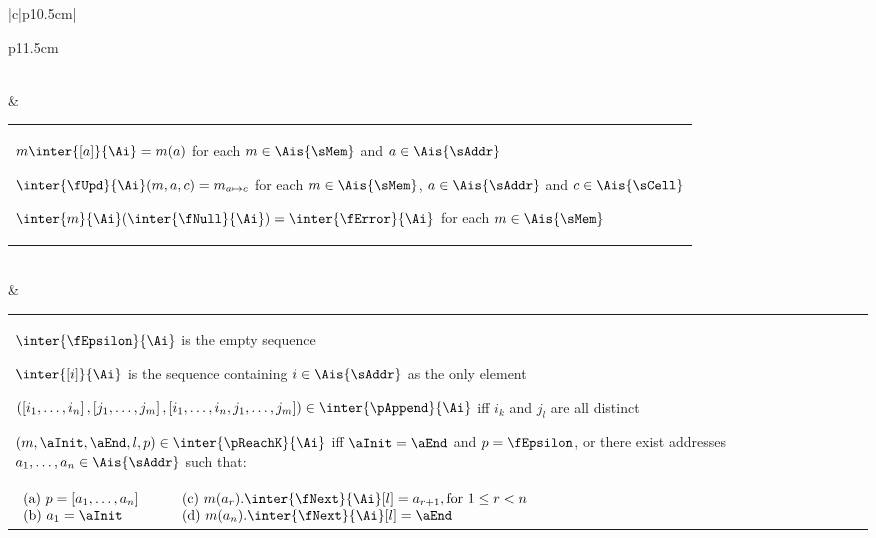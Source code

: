 {\begin{tabular}{|c|p{10.5cm}|}
\begin{tabular}{p{11.5cm}}
\begin{compactitem}
			\rangle$
			for each $e \in \Ais{\sElem}$,
			$k \in \Ais{\sOrd}$,
			$ \in \Ais{\sAddr}^{\K}$,
			$j \in \Ais{\sLevelK}$
			and $t_0, \ldots, t_{} \in \Ais{\sThId}$
		\item $\inter{\fError}{\Ai}.\inter{\fNext}{\Ai} =
			\inter{\fNull}{\Ai}$
		\end{compactitem}
	\end{tabular} \\
\hline
\sigMemory &
	\begin{tabular}{p{9.7cm}}
		\begin{compactitem}
		\item $m\inter{[a]}{\Ai} = m(a)$ for each $m \in \Ais{\sMem}$
			and $a \in \Ais{\sAddr}$
		\item $\inter{\fUpd}{\Ai}(m,a,c) = m_{a \mapsto c}$ for each
			$m \in \Ais{\sMem}$, $a \in \Ais{\sAddr}$ and
			$c \in \Ais{\sCell}$
		\item $(\inter{\fNull}{\Ai}) = 
			\inter{\fError}{\Ai}$
			for each $m \in \Ais{\sMem}$
		\end{compactitem}
	\end{tabular} \\
\hline
\sigReach &
	\begin{tabular}{p{11cm}}
		\begin{compactitem}
		\item $\inter{\fEpsilon}{\Ai}$ is the empty sequence
		\item $\inter{[i]}{\Ai}$ is the sequence containing $i \in 
			\Ais{\sAddr}$ as the only element
		\item $\left(, , 
			\right) \in \inter{\pAppend}{\Ai}$ iff $i_k$
		and $j_l$ are all distinct
		\item $(m, \aInit, \aEnd, l, p) \in \inter{\pReachK}{\Ai}$
			iff $\aInit=\aEnd$ and $p = \fEpsilon$, or
		there exist addresses $a_1, \ldots, a_n \in \Ais{\sAddr}$ such 
		that:
		\end{compactitem} \\
		\hs{1.5} $\begin{array}{ll}
			 p = [a_1, \ldots, a_n]  \phantom{aaaa}&
			 m(a_r).\inter{\fNext}{\Ai}[l]
				= a_{r+1},  1 \leq r < n \\
			 a_1 = \aInit &
			 m(a_n).\inter{\fNext}{\Ai}[l]
				= \aEnd
		\end{array}$
	\end{tabular} \\

\end{tabular}}
